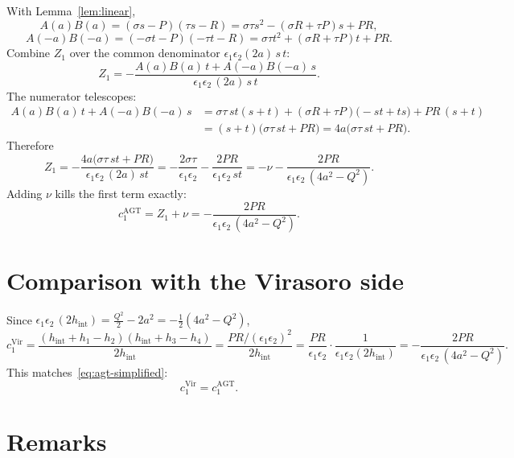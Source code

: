 \documentclass[11pt]{article}
\begin{document}
With Lemma~\ref{lem:linear},
\[
A(a)B(a)=(\sigma s-P)(\tau s-R)=\sigma\tau s^2-(\sigma R+\tau P)s+PR,
\]
\[
A(-a)B(-a)=(-\sigma t-P)(-\tau t-R)=\sigma\tau t^2+(\sigma R+\tau P)t+PR.
\]
Combine $Z_1$ over the common denominator $\epsilon_1\epsilon_2(2a)\,s\,t$:
\[
Z_1=-\frac{A(a)B(a)\,t+A(-a)B(-a)\,s}{\epsilon_1\epsilon_2\,(2a)\,s\,t}.
\]
The numerator telescopes:
\begin{align*}
A(a)B(a)\,t+A(-a)B(-a)\,s
&= \sigma\tau\,st(s+t)
  +(\sigma R+\tau P)\bigl(-st+ts\bigr)
  +PR\,(s+t)\\
&= (s+t)\bigl(\sigma\tau\,st+PR\bigr)
 = 4a\bigl(\sigma\tau\,st+PR\bigr).
\end{align*}
Therefore
\[
Z_1
=-\frac{4a\bigl(\sigma\tau\,st+PR\bigr)}{\epsilon_1\epsilon_2\,(2a)\,st}
=-\frac{2\sigma\tau}{\epsilon_1\epsilon_2}-\frac{2PR}{\epsilon_1\epsilon_2\,st}
=-\nu-\frac{2PR}{\epsilon_1\epsilon_2\,(4a^2-Q^2)}.
\]
Adding $\nu$ kills the first term exactly:
\begin{equation}
\label{eq:agt-simplified}
c_1^{\mathrm{AGT}}=Z_1+\nu=-\frac{2PR}{\epsilon_1\epsilon_2\,(4a^2-Q^2)}.
\end{equation}

\section*{Comparison with the Virasoro side}

Since $\epsilon_1\epsilon_2\,(2h_{\mathrm{int}})=\tfrac{Q^2}{2}-2a^2=-\tfrac12(4a^2-Q^2)$,
\[
c_1^{\mathrm{Vir}}
=\frac{(h_{\mathrm{int}}+h_1-h_2)(h_{\mathrm{int}}+h_3-h_4)}{2h_{\mathrm{int}}}
=\frac{PR/(\epsilon_1\epsilon_2)^2}{2h_{\mathrm{int}}}
=\frac{PR}{\epsilon_1\epsilon_2}\cdot\frac{1}{\epsilon_1\epsilon_2(2h_{\mathrm{int}})}
=-\frac{2PR}{\epsilon_1\epsilon_2\,(4a^2-Q^2)}.
\]
This matches~\eqref{eq:agt-simplified}:
\[
c_1^{\mathrm{Vir}}=c_1^{\mathrm{AGT}}.
\]

\section*{Remarks}
\end{document}
